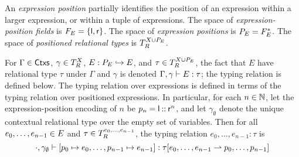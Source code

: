 An \emph{expression position} partially identifies the position of an
expression within a larger expression, or within a tuple of
expressions.
%
The space of \emph{expression-position fields} is
$F_E = \{  \mathsf{l}, \mathsf{r}  \}$.
%
The space of \emph{expression positions} is
$P_E = F_E^{*}$.
% 
The space of \emph{positioned relational types} is
$T_{R}^{X \cup P_E}$.

For $\Gamma \in \mathsf{Ctxs}$, $\gamma \in T_R^{X}$,
$E : P_E \hookrightarrow E$, and $\tau \in T_R^{X \cup P_E}$, the fact
that $E$ have relational type $\tau$ under $\Gamma$ and $\gamma$ is
denoted $\Gamma, \gamma \vdash E : \tau$;
%
the typing relation is defined below.
%
The typing relation over expressions is defined in terms of the typing
relation over positioned expressions.
%
In particular, for each $n \in \mathbb{N}$, let the expression-position
encoding of $n$ be $p_{n} = \mathsf{l} \mathbin{::} \mathsf{r}^{n}$, and
let $\gamma_{\emptyset}$ denote the unique contextual relational type
over the empty set of variables.
%
Then for all $e_0, \ldots, e_{n - 1} \in E$ and
$\tau \in T_{R}^{ e_0, \ldots, e_{n - 1} }$, the typing relation
$e_0, \ldots, e_{n - 1} : \tau$ is
\[ \cdot, \gamma_{\emptyset} \vdash [ p_{0} \mapsto e_0, \ldots,
  p_{n - 1} \mapsto e_{n - 1} ] :  \tau [  e_0, \ldots,
    e_{n - 1}  \rightharpoonup  p_{0}, \ldots, p_{n - 1}  ] \]

